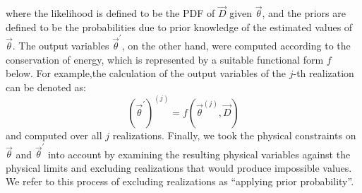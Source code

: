 where the likelihood is defined to be the PDF of $\vec{D}$ given $\vec{\theta}$,
and the priors are
defined to be the probabilities due to prior knowledge of the estimated values of
$\vec{\theta}$. The output variables $\vec{\theta}^\prime$, on the other
hand, were computed according to the conservation of energy, which is
represented by a suitable functional form $f$ below. For example,the
calculation of the output variables of the $j$-th realization can be denoted as: 
\begin{equation}
    (\vec{\theta}^\prime)^{(j)} = f(\vec{\theta}^{(j)}, \vec{D}) 
\end{equation}    
and computed over all $j$ realizations. Finally, we took the physical
constraints on $\vec{\theta}$ and $\vec{\theta}^\prime$ into account by
examining the resulting physical variables against the physical limits and
excluding realizations that would produce impossible values. We refer to this
process of excluding realizations as ``applying prior probability''. 

